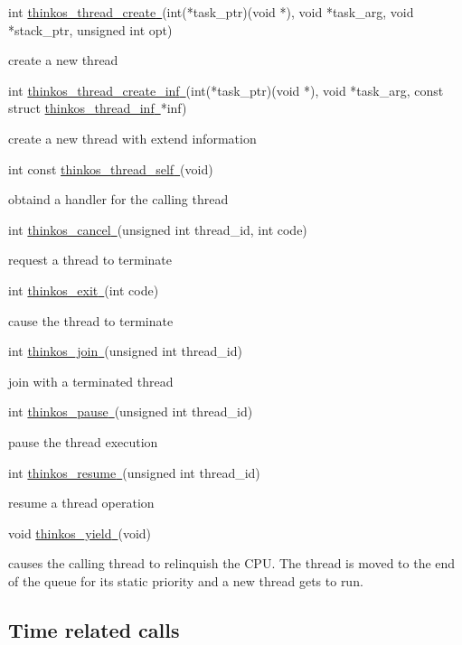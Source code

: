 {int
}{\protect\hyperlink{h.1fob9te}{thinkos\_thread\_create}}{\protect\hyperlink{h.1fob9te}{~}}{(int(*task\_ptr)(void
*), void *task\_arg, void *stack\_ptr, unsigned int opt)}

{create a new thread }

{int
}{\protect\hyperlink{h.3znysh7}{thinkos\_thread\_create\_inf}}{\protect\hyperlink{h.3znysh7}{~}}{(int(*task\_ptr)(void
*), void *task\_arg, const struct
}{\protect\hyperlink{h.2iq8gzs}{thinkos\_thread\_inf}}{\protect\hyperlink{h.2iq8gzs}{~}}{*inf)}

{create a new thread with extend information }

{int const
}{\protect\hyperlink{h.2et92p0}{thinkos\_thread\_self}}{\protect\hyperlink{h.2et92p0}{~}}{(void)}

{obtaind a handler for the calling thread }

{int
}{\protect\hyperlink{h.tyjcwt}{thinkos\_cancel}}{\protect\hyperlink{h.tyjcwt}{~}}{(unsigned
int thread\_id, int code)}

{request a thread to terminate }

{int
}{\protect\hyperlink{h.3dy6vkm}{thinkos\_exit}}{\protect\hyperlink{h.3dy6vkm}{~}}{(int
code)}

{cause the thread to terminate }

{int
}{\protect\hyperlink{h.1t3h5sf}{thinkos\_join}}{\protect\hyperlink{h.1t3h5sf}{~}}{(unsigned
int thread\_id)}

{join with a terminated thread }

{int
}{\protect\hyperlink{h.4d34og8}{thinkos\_pause}}{\protect\hyperlink{h.4d34og8}{~}}{(unsigned
int thread\_id)}

{pause the thread execution }

{int
}{\protect\hyperlink{h.2s8eyo1}{thinkos\_resume}}{\protect\hyperlink{h.2s8eyo1}{~}}{(unsigned
int thread\_id)}

{resume a thread operation }

{void
}{\protect\hyperlink{h.17dp8vu}{thinkos\_yield}}{\protect\hyperlink{h.17dp8vu}{~}}{(void)}

{causes the calling thread to relinquish the CPU. The thread is moved to
the end of the queue for its static priority and a new thread gets to
run. }

\subsection{\texorpdfstring{{Time related
calls}}{Time related calls}}\label{h.fj4n6rp8qwm7}

